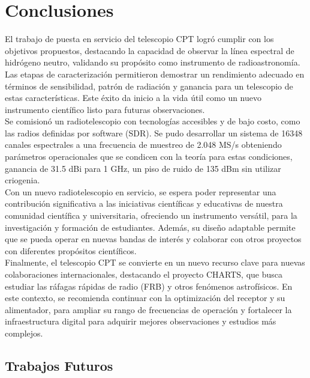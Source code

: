 \chapter{Conclusiones}

El trabajo de puesta en servicio del telescopio CPT logró cumplir con los objetivos propuestos, destacando la capacidad de observar la línea espectral de hidrógeno neutro, validando su propósito como instrumento de radioastronomía. Las etapas de caracterización permitieron demostrar un rendimiento adecuado en términos de sensibilidad, patrón de radiación y ganancia para un telescopio de estas características. Este éxito da inicio a la vida útil como un nuevo instrumento científico listo para futuras observaciones.\\

Se comisionó un radiotelescopio con tecnologías accesibles y de bajo costo, como las radios definidas por software (SDR). Se pudo desarrollar un sistema de 16348 canales espectrales a una frecuencia de muestreo de 2.048 MS/s obteniendo parámetros operacionales que se condicen con la teoría para estas condiciones, ganancia de 31.5 dBi para 1 GHz, un piso de ruido de 135 dBm sin utilizar criogenia.\\

Con un nuevo radiotelescopio en servicio, se espera poder representar una contribución significativa a las iniciativas científicas y educativas de nuestra comunidad científica y universitaria, ofreciendo un instrumento versátil, para la investigación y formación de estudiantes. Además, su diseño adaptable permite que se pueda operar en nuevas bandas de interés y colaborar con otros proyectos con diferentes propósitos científicos.\\

Finalmente, el telescopio CPT se convierte en un nuevo recurso clave para nuevas colaboraciones internacionales, destacando el proyecto CHARTS, que busca estudiar las ráfagas rápidas de radio (FRB) y otros fenómenos astrofísicos. En este contexto, se recomienda continuar con la optimización del receptor y su alimentador, para ampliar su rango de frecuencias de operación y fortalecer la infraestructura digital para adquirir mejores observaciones y estudios más complejos.\\

\section{Trabajos Futuros}

